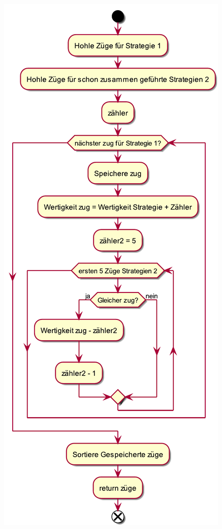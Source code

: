 \begin{DoxyImageNoCaption}
  \mbox{\includegraphics[width=\textwidth,height=\textheight/2,keepaspectratio=true]{KI_mergeStrategie}}
\end{DoxyImageNoCaption}
 
